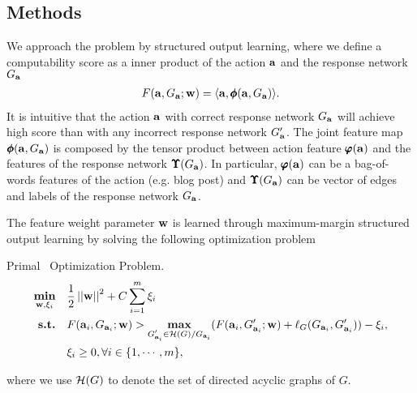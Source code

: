 {%
\subsection{Methods}
We approach the problem by structured output learning, where we define a computability score as a inner product of the action $\mathbf {a}$ and the response network $G_{\mathbf {a}}$
\begin{align*}
	F(\mathbf {a},G_{\mathbf {a}};\mathbf {w}) = \langle \mathbf {a}, \pmb \phi(\mathbf {a},G_{\mathbf {a}}) \rangle.
\end{align*}
It is intuitive that the action $\mathbf {a}$ with correct response network $G_{\mathbf {a}}$ will achieve high score than with any incorrect response network $G_{\mathbf {a}}'$.
The joint feature map $\pmb \phi(\mathbf {a},G_{\mathbf {a}})$ is composed by the tensor product between action feature $\pmb \varphi(\mathbf {a})$ and the features of the response network $\pmb \Upsilon(G_{\mathbf {a}})$.
In particular, $\pmb \varphi(\mathbf {a})$ can be a bag-of-words features of the action (e.g. blog post) and $\pmb \Upsilon(G_{\mathbf {a}})$ can be vector of edges and labels of the response network $G_{\mathbf {a}}$.

The feature weight parameter $\mathbf {w}$ is learned through maximum-margin structured output learning by solving the following optimization problem
\begin{definition}{Primal \spin\ Optimization Problem.}
\begin{align*}
	\underset{\mathbf {w},\mathbf{\xi}_i}{\textbf{min}} &\quad \frac{1}{2}\left|\left| \mathbf {w} \right|\right|^2+C\sum_{i=1}^{m}\xi_i\\
	\textbf{s.t.} &\quad F(\mathbf {a}_i,G_{\mathbf {a}_i};\mathbf {w}) > \underset{\substack{G_{\mathbf {a}_i}'\in\mathcal{H}(G)/G_{\mathbf {a}_i}}}{\textbf{max}}(F(\mathbf {a}_i,G_{\mathbf {a}_i}';\mathbf {w})+\mathbf {\ell}_{G}(G_{\mathbf {a}_i},G_{\mathbf {a}_i}')) - \xi_i,\\
	&\quad \xi_i\ge0, \forall i\in\{1,\cdots,m\},
\end{align*}
\end{definition}
where we use $\mathcal{H}(G)$ to denote the set of directed acyclic graphs of $G$.

}
